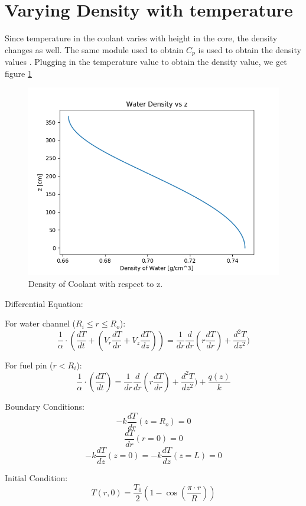 \documentclass[12pt,letterpaper]{article}
\begin{document}
\section*{Varying Density with temperature}
Since temperature in the coolant varies with height in the core,
the density changes as well. The same module used to obtain $C_p$
is used to obtain the density values \cite{romera_iapws:_2017}.
Plugging in the temperature value to obtain the density value, we get
figure \ref{fig:rho_c_z}

\begin{figure}[htbp!]
    \begin{center}
        \includegraphics[scale=0.7]{rho_c_z.png}
    \end{center}
    \caption{Density of Coolant with respect to z.}
    \label{fig:rho_c_z}
\end{figure}



\pagebreak
Differential Equation:

For water channel ($R_i \leq r \leq R_o$):
\[\frac{1}{\alpha} \cdot (\frac{dT}{dt} + (V_r \frac{dT}{dr} + V_z \frac{dT}{dz})) =
  \frac{1}{dr} \frac{d}{dr} (r \frac{dT}{dr}) + \frac{d^2T}{dz^2})\]

For fuel pin ($r < R_i$):
\[\frac{1}{\alpha} \cdot (\frac{dT}{dt}) =
  \frac{1}{dr} \frac{d}{dr} (r \frac{dT}{dr}) + \frac{d^2T}{dz^2}) + \frac{q(z)}{k}\]

Boundary Conditions:
\[-k \frac{dT}{dr}(z=R_o) = 0 \]
\[\frac{dT}{dr}(r=0) = 0\]
\[-k \frac{dT}{dz}(z=0) = -k \frac{dT}{dz}(z=L) = 0 \]
 

Initial Condition:
\[T(r,0) = \frac{T_0}{2} (1-\cos{(\frac{\pi \cdot r}{R})}) \]
\end{document}
